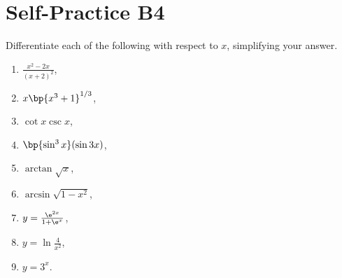 \section{Self-Practice B4}

\begin{problem}
    Differentiate each of the following with respect to $x$, simplifying your answer.
    \begin{enumerate}
        \item $\frac{x^2 - 2x}{(x+2)^2}$,
        \item $x\bp{x^3 + 1}^{1/3}$,
        \item $\cot x \csc x$,
        \item $\bp{\sin^3 x} (\sin 3x)$,
        \item $\arctan \sqrt x$,
        \item $\arcsin \sqrt{1 - x^2}$,
        \item $y = \frac{\e^{2x}}{1 + \e^x}$,
        \item $y = \ln \frac4{x^2}$,
        \item $y = 3^x$.
    \end{enumerate}
\end{problem}

